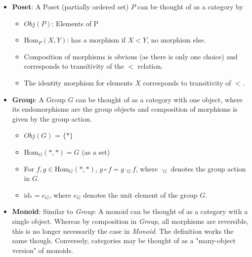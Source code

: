 \documentclass{article}
\theoremstyle{definition}
\begin{document}
\begin{itemize}
    \item \textbf{Poset}: A Poset (partially ordered set) $P$ can be thought of as a category by
    \begin{itemize}
        \item $Obj(P)$: Elements of P
        \item $\text{Hom}_P(X,Y)$: has a morphism if $X < Y$, no morphism else.
        \item Composition of morphisms is obvious (as there is only one choice) and corresponds to transitivity of the $ < $ relation.
        \item The identity morphism for elements $X$ corresponds to transitivity of $ < $.
    \end{itemize}
    \item \textbf{Group}: A Group $G$ can be thought of as a category with one object, where its endomorphisms are the group objects and composition of morphisms is given by the group action.
    \begin{itemize}
        \item $Obj(G)$ = $\{*\}$
        \item $\text{Hom}_G(*, *) = G$ (as a set)
        \item For $f, g \in \text{Hom}_G(*,*)$, $g\circ f = g \cdot_G f$, where $\cdot_G$ denotes the group action in $G$.
        \item $\text{id}_* = e_G$, where $e_G$ denotes the unit element of the group $G$. 
    \end{itemize}
    \item \textbf{Monoid}: Similar to \textit{Group}: A monoid can be thought of as a category with a single object. Whereas by composition in \textit{Group}, all morphisms are reversible, this is no longer necessarily the case in \textit{Monoid}. The definition works the same though. Conversely, categories may be thought of as a "many-object version" of monoids.
\end{itemize}
\end{document}
